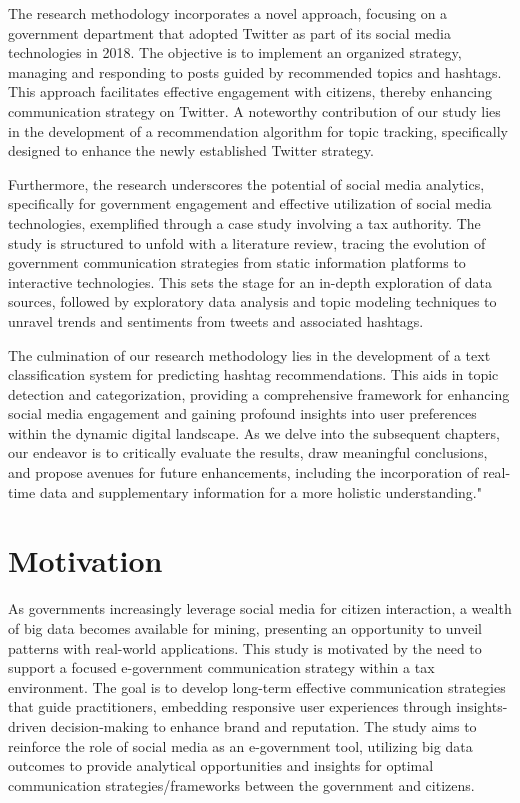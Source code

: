 The research methodology incorporates a novel approach, focusing on a government department that adopted Twitter as part of its social media technologies in 2018. The objective is to implement an organized strategy, managing and responding to posts guided by recommended topics and hashtags. This approach facilitates effective engagement with citizens, thereby enhancing communication strategy on Twitter. A noteworthy contribution of our study lies in the development of a recommendation algorithm for topic tracking, specifically designed to enhance the newly established Twitter strategy.

Furthermore, the research underscores the potential of social media analytics, specifically for government engagement and effective utilization of social media technologies, exemplified through a case study involving a tax authority. The study is structured to unfold with a literature review, tracing the evolution of government communication strategies from static information platforms to interactive technologies. This sets the stage for an in-depth exploration of data sources, followed by exploratory data analysis and topic modeling techniques to unravel trends and sentiments from tweets and associated hashtags.

The culmination of our research methodology lies in the development of a text classification system for predicting hashtag recommendations. This aids in topic detection and categorization, providing a comprehensive framework for enhancing social media engagement and gaining profound insights into user preferences within the dynamic digital landscape. As we delve into the subsequent chapters, our endeavor is to critically evaluate the results, draw meaningful conclusions, and propose avenues for future enhancements, including the incorporation of real-time data and supplementary information for a more holistic understanding."

\section{Motivation}
\label{sec:first:motivation}

As governments increasingly leverage social media for citizen interaction, a wealth of big data becomes available for mining, presenting an opportunity to unveil patterns with real-world applications. This study is motivated by the need to support a focused e-government communication strategy within a tax environment. The goal is to develop long-term effective communication strategies that guide practitioners, embedding responsive user experiences through insights-driven decision-making to enhance brand and reputation. The study aims to reinforce the role of social media as an e-government tool, utilizing big data outcomes to provide analytical opportunities and insights for optimal communication strategies/frameworks between the government and citizens.

